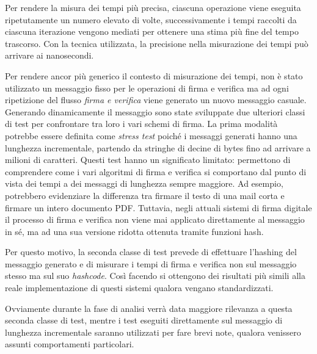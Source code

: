 Per rendere la misura dei tempi più precisa, ciascuna operazione viene eseguita ripetutamente un numero elevato di volte, successivamente i tempi raccolti da ciascuna iterazione vengono mediati per ottenere una stima più fine del tempo trascorso. Con la tecnica utilizzata, la precisione nella misurazione dei tempi può arrivare ai nanosecondi.

Per rendere ancor più generico il contesto di misurazione dei tempi, non è stato utilizzato un messaggio fisso per le operazioni di firma e verifica ma ad ogni ripetizione del flusso \textit{firma e verifica} viene generato un nuovo messaggio casuale. Generando dinamicamente il messaggio sono state sviluppate due ulteriori classi di test per confrontare tra loro i vari schemi di firma. La prima modalità potrebbe essere definita come \textit{stress test} poiché i messaggi generati hanno una lunghezza incrementale, partendo da stringhe di decine di bytes fino ad arrivare a milioni di caratteri. Questi test hanno un significato limitato: permettono di comprendere come i vari algoritmi di firma e verifica si comportano dal punto di vista dei tempi a dei messaggi di lunghezza sempre maggiore. Ad esempio, potrebbero evidenziare la differenza tra firmare il testo di una mail corta e firmare un intero documento PDF. Tuttavia, negli attuali sistemi di firma digitale il processo di firma e verifica non viene mai applicato direttamente al messaggio in sé, ma ad una sua versione ridotta ottenuta tramite funzioni hash.

Per questo motivo, la seconda classe di test prevede di effettuare l'hashing del messaggio generato e di misurare i tempi di firma e verifica non sul messaggio stesso ma sul suo \textit{hashcode}. Così facendo si ottengono dei risultati più simili alla reale implementazione di questi sistemi qualora vengano standardizzati.

Ovviamente durante la fase di analisi verrà data maggiore rilevanza a questa seconda classe di test, mentre i test eseguiti direttamente sul messaggio di lunghezza incrementale saranno utilizzati per fare brevi note, qualora venissero assunti comportamenti particolari.

